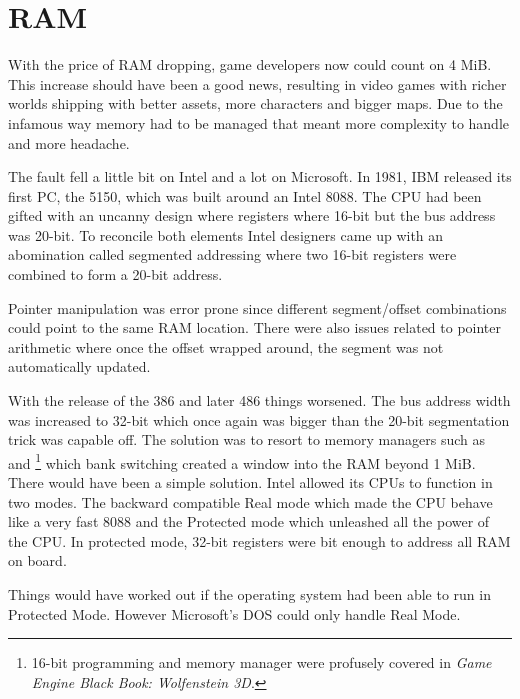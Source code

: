 \section{RAM}
With the price of RAM dropping, game developers now could count on 4 MiB. This increase should have been a good news, resulting in video games with richer worlds shipping with better assets, more characters and bigger maps. Due to the infamous way memory had to be managed that meant more complexity to handle and more headache.\\
\par
The fault fell a little bit on Intel and a lot on Microsoft. In 1981, IBM released its first PC, the 5150,  which was built around an Intel 8088. The CPU had been gifted with an uncanny design where registers where 16-bit but the bus address was 20-bit. To reconcile both elements Intel designers came up with an abomination called segmented addressing where two 16-bit registers were combined to form a 20-bit address.\\
\par


\par
Pointer manipulation was error prone since different segment/offset combinations could point to the same RAM location. There were also issues related to pointer arithmetic where once the offset wrapped around, the segment was not automatically updated.\\
\par
With the release of the 386 and later 486 things worsened. The bus address width was increased to 32-bit which once again was bigger than the 20-bit segmentation trick was capable off. The solution was to resort to memory managers such as  and \footnote{16-bit programming and memory manager were profusely covered in \textit{Game Engine Black Book: Wolfenstein 3D}.} which  bank switching created a window into the RAM beyond 1 MiB.\\

There would have been a simple solution. Intel allowed its CPUs to function in two modes. The backward compatible Real mode which made the CPU behave like a very fast 8088 and the Protected mode which unleashed all the power of the CPU. In protected mode, 32-bit registers were bit enough to address all RAM on board.\\
\par
Things would have worked out if the operating system had been able to run in Protected Mode. However Microsoft's DOS could only handle Real Mode.\\ 
\par




